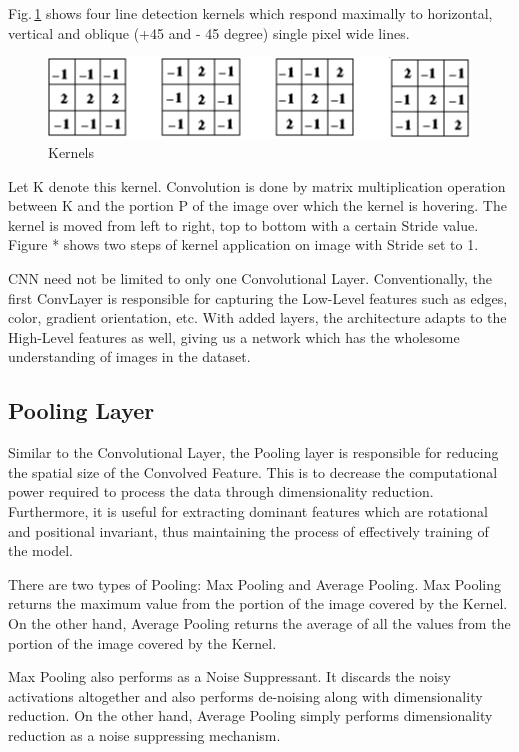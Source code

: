 Fig.\,\ref{kernels} shows four line detection kernels which respond maximally to horizontal, vertical and oblique (+45 and - 45 degree) single pixel wide lines.

\begin{figure}[h]
	\centering
	\includegraphics[scale=0.6]{Figs/kernels.png}
    \caption{Kernels}
    \label{kernels}
\end{figure}

Let K denote this kernel. Convolution is done by matrix multiplication operation between K and the portion P of the image over which the kernel is hovering. The kernel is moved from left to right, top to bottom with a certain Stride value. Figure * shows two steps of kernel application on image with Stride set to 1. 

CNN need not be limited to only one Convolutional Layer. Conventionally, the first ConvLayer is responsible for capturing the Low-Level features such as edges, color, gradient orientation, etc. With added layers, the architecture adapts to the High-Level features as well, giving us a network which has the wholesome understanding of images in the dataset.

\subsection{Pooling Layer}

Similar to the Convolutional Layer, the Pooling layer is responsible for reducing the spatial size of the Convolved Feature. This is to decrease the computational power required to process the data through dimensionality reduction. Furthermore, it is useful for extracting dominant features which are rotational and positional invariant, thus maintaining the process of effectively training of the model.

There are two types of Pooling: Max Pooling and Average Pooling. Max Pooling returns the maximum value from the portion of the image covered by the Kernel. On the other hand, Average Pooling returns the average of all the values from the portion of the image covered by the Kernel.

Max Pooling also performs as a Noise Suppressant. It discards the noisy activations altogether and also performs de-noising along with dimensionality reduction. On the other hand, Average Pooling simply performs dimensionality reduction as a noise suppressing mechanism. 

